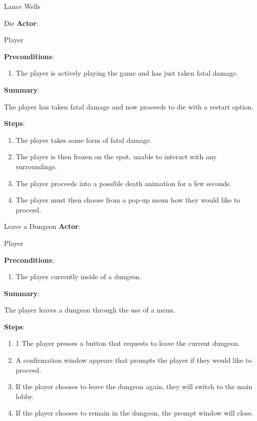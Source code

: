 \documentclass[12pt]{report}
\begin{document}
\begin{section}{Lance Wells}
\begin{subsection}{Die}
\textbf{Actor}:

Player

\textbf{Preconditions}:

\begin{enumerate}
\item The player is actively playing the game and has just taken
fatal damage.
\end{enumerate}

\textbf{Summary}:

The player has taken fatal damage and now proceeds to die with a
restart option.

\textbf{Steps}:

\begin{enumerate}
\item The player takes some form of fatal damage.
\item The player is then frozen on the spot, unable to interact with any
surroundings.
\item The player proceeds into a possible death animation for a few seconds.
\item The player must then choose from a pop-up menu how they would like to
proceed.
\end{enumerate}
\end{subsection}

\begin{subsection}{Leave a Dungeon}
\textbf{Actor}:

Player

\textbf{Preconditions}:

\begin{enumerate}
\item The player currently inside of a dungeon.
\end{enumerate}

\textbf{Summary}:

The player leaves a dungeon through the use of a menu.

\textbf{Steps}:

\begin{enumerate}
\item1 The player presses a button that requests to leave the current
dungeon.
\item A confirmation window appears that prompts the player if they would
like to proceed.
\item If the player chooses to leave the dungeon again, they will switch
to the main lobby.
\item If the player chooses to remain in the dungeon, the prompt window will
close.
\end{enumerate}
\end{subsection}


\end{section}
\end{document}
